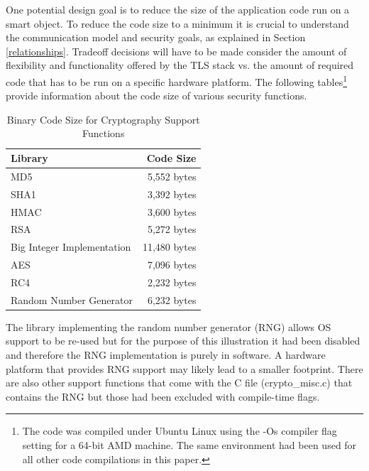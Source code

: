 \documentclass[a4paper, 10pt]{IEEEtran}
\begin{document}
One potential design goal is to reduce the size of the application code run on a smart object. To reduce the code size to a minimum it is crucial to understand the communication model and security goals, as explained in Section \ref{relationships}. Tradeoff decisions will have to be made consider the amount of flexibility and functionality offered by the TLS stack vs. the amount of required code that has to be run on a specific hardware platform. The following tables\footnote{The code was compiled under Ubuntu Linux using the -Os compiler flag setting for a 64-bit AMD machine. The same environment had been used for all other code compilations in this paper.} provide information about the code size of various security functions. 

\begin{table}[htdp]
\caption{Binary Code Size for Cryptography Support Functions}
\begin{center}
\begin{tabular}{|l|r|}
\hline
\textbf{Library} & \textbf{Code Size}\\
\hline\hline
MD5 & 5,552 bytes \\ 
\hline\hline
SHA1 & 3,392 bytes \\ 
\hline\hline
HMAC & 3,600 bytes \\
\hline\hline
RSA & 5,272 bytes \\
\hline\hline
Big Integer Implementation & 11,480 bytes \\ 
\hline\hline
AES & 7,096 bytes \\
\hline\hline
RC4 & 2,232 bytes \\ 
\hline\hline
Random Number Generator & 6,232 bytes \\
\hline
\end{tabular}
\end{center}
\label{crypto-code-table}
\end{table}

The library implementing the random number generator (RNG) allows OS support to be re-used but for the purpose of this illustration it had been disabled and therefore the RNG implementation is purely in software. A hardware platform that provides RNG support may likely lead to a smaller footprint. There are also other support functions that come with the C file (crypto\_misc.c) that contains the RNG  but those had been excluded with compile-time flags.
\end{document}
